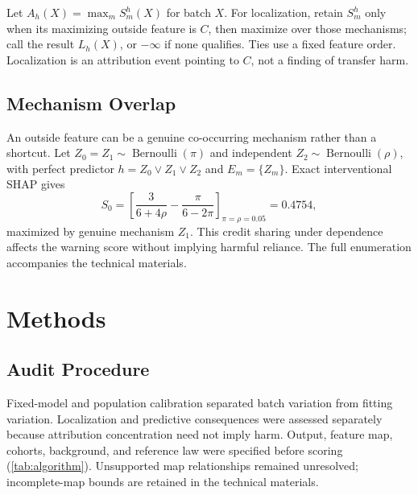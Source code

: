 \documentclass[conference]{IEEEtran}
\begin{document}
Let $A_h(X)=\max_m S_m^h(X)$ for batch $X$. For localization, retain $S_m^h$ only when its maximizing outside feature is $C$, then maximize over those mechanisms; call the result $L_h(X)$, or $-\infty$ if none qualifies. Ties use a fixed feature order. Localization is an attribution event pointing to $C$, not a finding of transfer harm.

\subsection{Mechanism Overlap}
An outside feature can be a genuine co-occurring mechanism rather than a shortcut. Let $Z_0=Z_1\sim\operatorname{Bernoulli}(\pi)$ and independent $Z_2\sim\operatorname{Bernoulli}(\rho)$, with perfect predictor $h=Z_0\lor Z_1\lor Z_2$ and $E_m=\{Z_m\}$. Exact interventional SHAP gives
\begin{equation}
 S_0=\left[\frac{3}{6+4\rho}-\frac{\pi}{6-2\pi}\right]_{\pi=\rho=0.05}=0.4754,
\end{equation}
maximized by genuine mechanism $Z_1$. This credit sharing under dependence~\cite{janzing2020feature,kumar2020problems} affects the warning score without implying harmful reliance. The full enumeration accompanies the technical materials.

\section{Methods}
\label{sec:method}
\subsection{Audit Procedure}
Fixed-model and population calibration separated batch variation from fitting variation. Localization and predictive consequences were assessed separately because attribution concentration need not imply harm. Output, feature map, cohorts, background, and reference law were specified before scoring (\cref{tab:algorithm}). Unsupported map relationships remained unresolved; incomplete-map bounds are retained in the technical materials.
\end{document}
